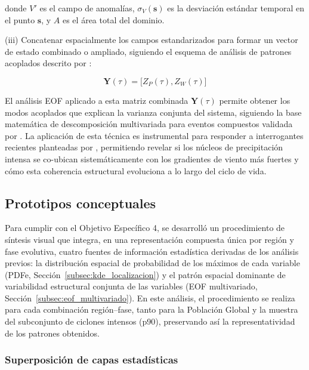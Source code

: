 donde $V'$ es el campo de anomalías, $\sigma_{V}(\mathbf{s})$ es la desviación estándar temporal en el punto $\mathbf{s}$, y $A$ es el área total del dominio.

(iii) Concatenar espacialmente los campos estandarizados para formar un vector de estado combinado o ampliado, siguiendo el esquema de análisis de patrones acoplados descrito por \citet{bretherton1992intercomparison}:

\begin{equation}\label{eq:meof_vector}
    \mathbf{Y}(\tau) = \big[ Z_P(\tau), Z_W(\tau) \big]
\end{equation}

El análisis EOF aplicado a esta matriz combinada $\mathbf{Y}(\tau)$ permite obtener los modos acoplados que explican la varianza conjunta del sistema, siguiendo la base matemática de descomposición multivariada para eventos compuestos validada por \citet{liang2018multivariate}. La aplicación de esta técnica es instrumental para responder a interrogantes recientes planteadas por \citet{sinclair2023relationship}, permitiendo revelar si los núcleos de precipitación intensa se co-ubican sistemáticamente con los gradientes de viento más fuertes y cómo esta coherencia estructural evoluciona a lo largo del ciclo de vida.

\subsection{Prototipos conceptuales}\label{subsec:prototipos}

Para cumplir con el Objetivo Específico 4, se desarrolló un procedimiento de síntesis visual que integra, en una representación compuesta única por región y fase evolutiva, cuatro fuentes de información estadística derivadas de los análisis previos: la distribución espacial de probabilidad de los máximos de cada variable (PDFe, Sección~\ref{subsec:kde_localizacion}) y el patrón espacial dominante de variabilidad estructural conjunta de las variables (EOF multivariado, Sección~\ref{subsec:eof_multivariado}). 
En este análisis, el procedimiento se realiza para cada combinación región--fase, tanto para la Población Global y la muestra del subconjunto de ciclones intensos (p90), preservando así la representatividad de los patrones obtenidos.

\subsubsection{Superposición de capas estadísticas}

